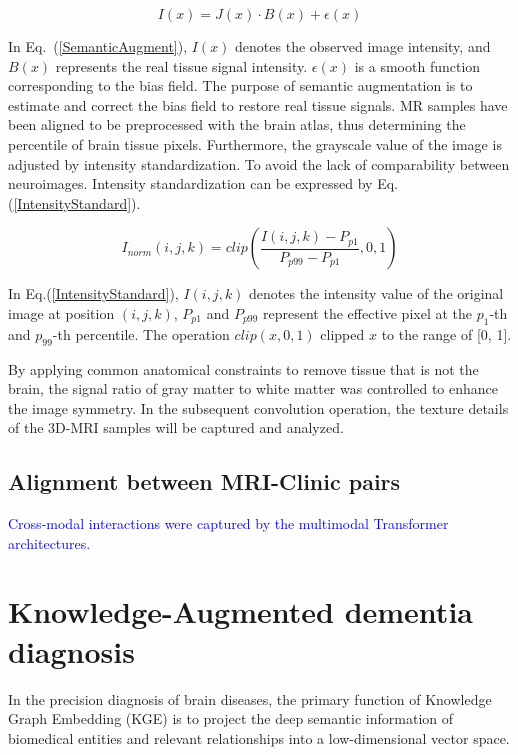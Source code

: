 \documentclass[lettersize,journal]{IEEEtran}
\begin{document}
    \begin{equation}
        I(x)=J(x)\cdot B(x)+\epsilon(x)
        \label{SemanticAugment}
    \end{equation}

    In Eq.~(\ref{SemanticAugment}), $I(x)$ denotes the observed image intensity, and $B(x)$ represents the real tissue signal intensity. $\epsilon(x)$ is a smooth function corresponding to the bias field. The purpose of semantic augmentation is to estimate and correct the bias field to restore real tissue signals. MR samples have been aligned to be preprocessed with the brain atlas, thus determining the percentile of brain tissue pixels. %
    Furthermore, the grayscale value of the image is adjusted by intensity standardization. To avoid the lack of comparability between neuroimages. Intensity standardization can be expressed by Eq.(\ref{IntensityStandard}).

    \begin{equation}
        I_{norm}(i,j,k)=clip(\frac{I(i,j,k)-P_{p1}}{P_{p99}-P_{p1}},0,1)
        \label{IntensityStandard}
    \end{equation}

    In Eq.(\ref{IntensityStandard}), $I(i,j,k)$ denotes the intensity value of the original image at position $(i,j,k)$, $P_{p1}$ and $P_{p99}$ represent the effective pixel at the $p_1$-th and $p_{99}$-th percentile. The operation $clip(x,0,1)$ clipped $x$ to the range of [0, 1]. 
    
    By applying common anatomical constraints to remove tissue that is not the brain, the signal ratio of gray matter to white matter was controlled to enhance the image symmetry. In the subsequent convolution operation, the texture details of the 3D-MRI samples will be captured and analyzed.

    \subsection{Alignment between MRI-Clinic pairs}

    \textcolor{blue}{Cross-modal interactions were captured by the multimodal Transformer architectures.}
    
\section{Knowledge-Augmented dementia diagnosis}

    \textcolor{blue}{}
    In the precision diagnosis of brain diseases, the primary function of Knowledge Graph Embedding (KGE) is to project the deep semantic information of biomedical entities and relevant relationships into a low-dimensional vector space. 
    
\end{document}
